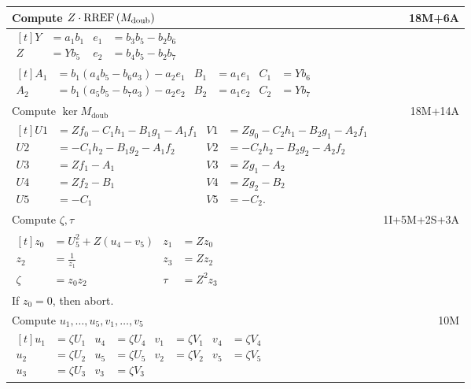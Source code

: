 \begin{longtable}{|l|r|}
  Compute $Z \cdot \operatorname{RREF}\left(M_{\text{doub}}\right)$ & 18M+6A \\
  \hline
  $\begin{aligned}[t]
    Y &= a_1b_1 & e_1 &= b_3b_5 - b_2b_6 \\
    Z &= Yb_5   & e_2 &= b_4b_5 - b_2b_7
  \end{aligned}$ & \\
  $\begin{aligned}[t]
    A_1 &= b_1(a_4b_5 - b_6a_3) - a_2e_1 & B_1 &= a_1e_1 & C_1 &= Yb_6 \\
    A_2 &= b_1(a_5b_5 - b_7a_3) - a_2e_2 & B_2 &= a_1e_2 & C_2 &= Yb_7
  \end{aligned}$ & \\
  \hline \hline
    Compute $\ker M_{\text{doub}}$ & 18M+14A \\
  \hline
  $\begin{aligned}[t]
    U1 &= Zf_0 - C_1h_1 - B_1g_1 - A_1f_1 & V1 &= Zg_0 - C_2h_1 - B_2g_1 - A_2f_1 \\
    U2 &=      - C_1h_2 - B_1g_2 - A_1f_2 & V2 &=      - C_2h_2 - B_2g_2 - A_2f_2 \\
    U3 &= Zf_1 - A_1 & V3 &= Zg_1 - A_2 \\
    U4 &= Zf_2 - B_1 & V4 &= Zg_2 - B_2 \\
    U5 &=      - C_1 & V5 &=      - C_2.
  \end{aligned}$ & \\
  \hline \hline
    Compute $\zeta, \tau$ & 1I+5M+2S+3A \\
  \hline
  $\begin{aligned}[t]
    z_0 &= U_5^2 + Z(u_4 - v_5) & z_1 &= Zz_0 \\
    z_2 &= \frac 1 {z_1} & z_3 &= Zz_2 \\
    \zeta &= z_0z_2 & \tau  &= Z^2z_3
  \end{aligned}$ & \\
  If $z_0 = 0$, then abort. & \\
  \hline \hline
    Compute $u_1, \ldots, u_5, v_1, \ldots, v_5$ & 10M \\
  \hline
  $\begin{aligned}[t]
    u_1 &= \zeta U_1 & u_4 &= \zeta U_4 & v_1 &= \zeta V_1 & v_4 &= \zeta V_4 \\
    u_2 &= \zeta U_2 & u_5 &= \zeta U_5 & v_2 &= \zeta V_2 & v_5 &= \zeta V_5 \\
    u_3 &= \zeta U_3                    & v_3 &= \zeta V_3
  \end{aligned}$ & \\

\end{longtable}
